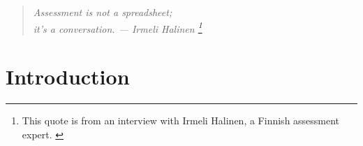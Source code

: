 \documentclass[fleqn,10pt]{SelfArx}\usepackage[]{graphicx}\usepackage[]{color}
\affiliation{\textsuperscript{1}\textit{General Education Coordinator, Ferris State University}} %
\begin{document}
\flushbottom %

\maketitle %

\tableofcontents %

{
	\fancyhf{}
}
\thispagestyle{firststyle}











\begin{quote}
\begin{center}
\textit{Assessment is not a spreadsheet; \\ it's a conversation. --- Irmeli Halinen \footnote{This quote is from an interview with Irmeli Halinen, a Finnish assessment expert. \citep{Bower}}}
\end{center}
\end{quote}

\section{Introduction} %
\end{document}

